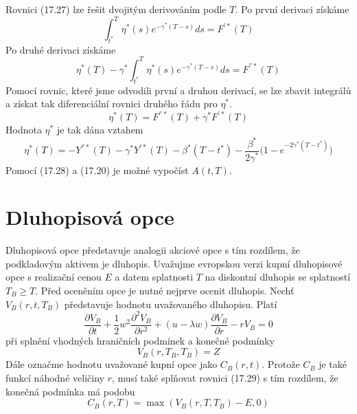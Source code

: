 \documentclass[a4paper]{book}
\begin{document}
Rovnici (17.27) lze řešit dvojitým derivováním podle $T$. Po první derivaci získáme
\begin{equation*}
\int_{t^{*}}^T \eta^{*}(s) e^{-\gamma^{*}(T-s)}ds = F^{'*}(T)
\end{equation*}
Po druhé derivaci získáme
\begin{equation*}
\eta^{*}(T) - \gamma^{*} \int_{t^{*}}^T \eta^{*}(s)e^{-\gamma^{*}(T-s)}ds = F^{''*}(T)
\end{equation*}
Pomocí rovnic, které jsme odvodili první a druhou derivací, se lze zbavit integrálů a získat tak diferenciální rovnici druhého řádu pro $\eta^{*}$.
\begin{equation*}
\eta^{*}(T) = F^{''*}(T) + \gamma^{*}F^{'*}(T)
\end{equation*}
Hodnota $\eta^{*}$ je tak dána vztahem
\begin{equation}
\eta^{*}(T) = -Y^{''*}(T) - \gamma^{*}Y^{'*}(T) - \beta^{*}(T - t^{*}) - \frac{\beta^{*}}{2 \gamma^{*}} \Bigg( 1 - e^{-2 \gamma^{*}(T - t^{*})}\Bigg)
\end{equation}
Pomocí (17.28) a (17.20) je možné vypočíst $A(t,T)$.

\section{Dluhopisová opce}

Dluhopisová opce představuje analogii akciové opce s tím rozdílem, že podkladovým aktivem je dluhopis. Uvažujme evropskou verzi kupní dluhopisové opce s realizační cenou $E$ a datem splatnosti $T$ na diskontní dluhopis se splatností $T_B \ge T$. Před oceněním opce je nutné nejprve ocenit dluhopis. Nechť $V_B(r,t,T_B)$ představuje hodnotu uvažovaného dluhopisu. Platí
\begin{equation}
\frac{\partial V_B}{\partial t} + \frac{1}{2}w^2 \frac{\partial^2 V_B}{\partial r^2} + (u - \lambda w) \frac{\partial V_B}{\partial r} - r V_B = 0
\end{equation}
při splnění vhodných hraničních podmínek a konečné podmínky
\begin{equation*}
V_B(r, T_B, T_B) = Z
\end{equation*}
Dále označme hodnotu uvažované kupní opce jako $C_B(r,t)$. Protože $C_B$ je také funkcí náhodné veličiny $r$, musí také splňovat rovnici (17.29) s tím rozdílem, že konečná podmínka má podobu
\begin{equation*}
C_B(r,T) = \max(V_B(r,T,T_B) - E, 0)
\end{equation*}
\end{document}
